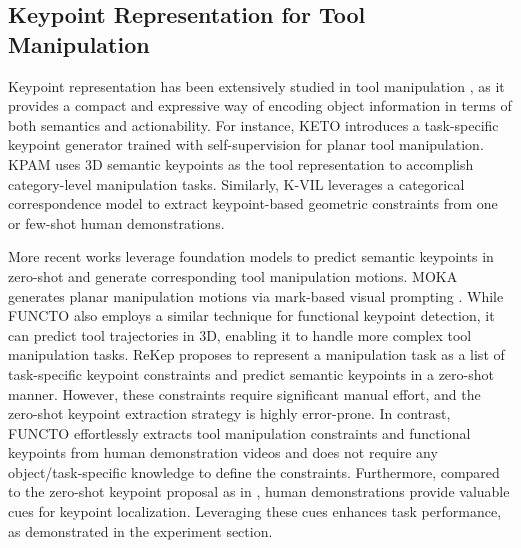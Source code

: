 \subsection{Keypoint Representation for Tool Manipulation}
Keypoint representation has been extensively studied in tool manipulation \cite{manuelli2019kpam, manuelli2021keypoints, qin2020keto, xu2021affordance, liu2024moka, huangrekep, gao2023k, gao2024bi}, as it provides a compact and expressive way of encoding object information in terms of both semantics and actionability. For instance, KETO \cite{qin2020keto} introduces a task-specific keypoint generator trained with self-supervision for planar tool manipulation. KPAM \cite{manuelli2019kpam} uses 3D semantic keypoints as the tool representation to accomplish category-level manipulation tasks. Similarly, K-VIL \cite{gao2023k, gao2024bi} leverages a categorical correspondence model \cite{florence2018dense} to extract keypoint-based geometric constraints from one or few-shot human demonstrations.

More recent works leverage foundation models to predict semantic keypoints in zero-shot and generate corresponding tool manipulation motions. MOKA \cite{liu2024moka} generates planar manipulation motions via mark-based visual prompting \cite{nasirianypivot}. While FUNCTO also employs a similar technique for functional keypoint detection, it can predict tool trajectories in 3D, enabling it to handle more complex tool manipulation tasks. ReKep \cite{huangrekep} proposes to represent a manipulation task as a list of task-specific keypoint constraints and predict semantic keypoints in a zero-shot manner. However, these constraints require significant manual effort, and the zero-shot keypoint extraction strategy is highly error-prone. In contrast, FUNCTO effortlessly extracts tool manipulation constraints and functional keypoints from human demonstration videos and does not require any object/task-specific knowledge to define the constraints. Furthermore, compared to the zero-shot keypoint proposal as in \cite{liu2024moka, huangrekep}, human demonstrations provide valuable cues for keypoint localization. Leveraging these cues enhances task performance, as demonstrated in the experiment section.


